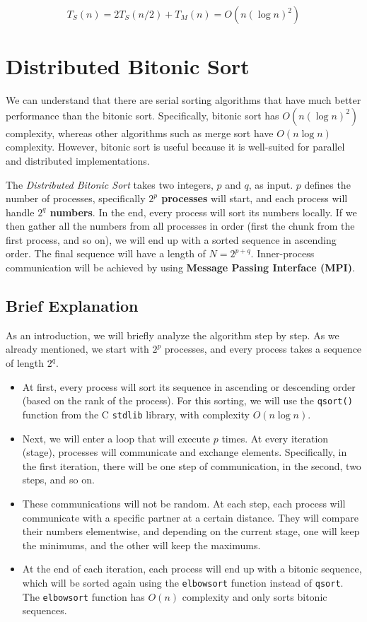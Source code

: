 \documentclass[12pt]{article}
\begin{document}
\[T_S(n) = 2 T_S(n/2) + T_M(n) = O(n (\log n)^2)\]

\newpage

\section{Distributed Bitonic Sort}

We can understand that there are serial sorting algorithms that have much better performance than the bitonic sort. Specifically, bitonic sort has \(O(n (\log n)^2)\) complexity, whereas other algorithms such as merge sort have \(O(n \log n)\) complexity. However, bitonic sort is useful because it is well-suited for parallel and distributed implementations.

The \textit{Distributed Bitonic Sort} takes two integers, \( p \) and \( q \), as input. \( p \) defines the number of processes, specifically \textbf{\( 2^p \) processes} will start, and each process will handle \textbf{\( 2^q \) numbers}. In the end, every process will sort its numbers locally. If we then gather all the numbers from all processes in order (first the chunk from the first process, and so on), we will end up with a sorted sequence in ascending order. The final sequence will have a length of \( N = 2^{p+q} \). Inner-process communication will be achieved by using \textbf{Message Passing Interface (MPI)}.

\subsection{Brief Explanation}
As an introduction, we will briefly analyze the algorithm step by step. As we already mentioned, we start with \(2^p\) processes, and every process takes a sequence of length \(2^q\).

\begin{itemize}
    \item At first, every process will sort its sequence in ascending or descending order (based on the rank of the process). For this sorting, we will use the \texttt{qsort()} function from the C \texttt{stdlib} library, with complexity \(O(n \log n)\).
    
    \item Next, we will enter a loop that will execute \(p\) times. At every iteration (stage), processes will communicate and exchange elements. Specifically, in the first iteration, there will be one step of communication, in the second, two steps, and so on.
    
    \item These communications will not be random. At each step, each process will communicate with a specific partner at a certain distance. They will compare their numbers elementwise, and depending on the current stage, one will keep the minimums, and the other will keep the maximums.
    
    \item At the end of each iteration, each process will end up with a bitonic sequence, which will be sorted again using the \texttt{elbowsort} function instead of \texttt{qsort}. The \texttt{elbowsort} function has \(O(n)\) complexity and only sorts bitonic sequences.
\end{itemize}
\end{document}
